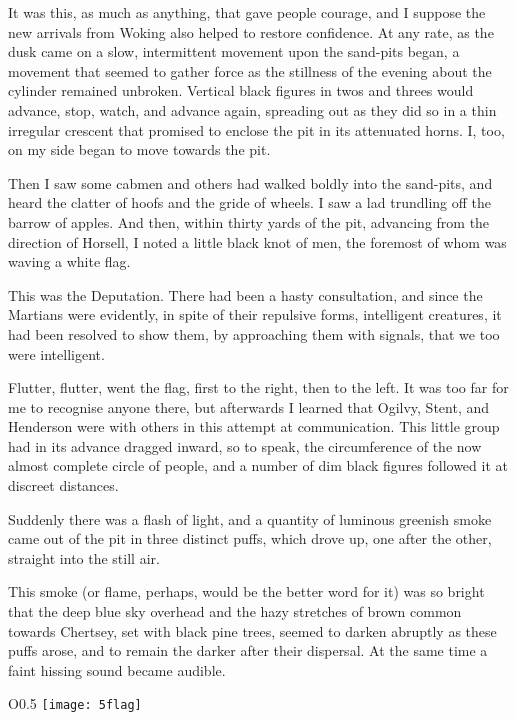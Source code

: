 It was this, as much as anything, that gave people courage, and I suppose the new arrivals from Woking also helped to restore confidence. At any rate, as the dusk came on a slow, intermittent movement upon the sand-pits began, a movement that seemed to gather force as the stillness of the evening about the cylinder remained unbroken. Vertical black figures in twos and threes would advance, stop, watch, and advance again, spreading out as they did so in a thin irregular crescent that promised to enclose the pit in its attenuated horns. I, too, on my side began to move towards the pit.

Then I saw some cabmen and others had walked boldly into the sand-pits, and heard the clatter of hoofs and the gride of wheels. I saw a lad trundling off the barrow of apples. And then, within thirty yards of the pit, advancing from the direction of Horsell, I noted a little black knot of men, the foremost of whom was waving a white flag.

This was the Deputation. There had been a hasty consultation, and since the Martians were evidently, in spite of their repulsive forms, intelligent creatures, it had been resolved to show them, by approaching them with signals, that we too were intelligent.

Flutter, flutter, went the flag, first to the right, then to the left. It was too far for me to recognise anyone there, but afterwards I learned that Ogilvy, Stent, and Henderson were with others in this attempt at communication. This little group had in its advance dragged inward, so to speak, the circumference of the now almost complete circle of people, and a number of dim black figures followed it at discreet distances.

Suddenly there was a flash of light, and a quantity of luminous greenish smoke came out of the pit in three distinct puffs, which drove up, one after the other, straight into the still air.

This smoke (or flame, perhaps, would be the better word for it) was so bright that the deep blue sky overhead and the hazy stretches of brown common towards Chertsey, set with black pine trees, seemed to darken abruptly as these puffs arose, and to remain the darker after their dispersal. At the same time a faint hissing sound became audible.

\begin{wrapfigure}{O}{0.5\textwidth}
\centering
\texttt{[image: 5flag]}
\end{wrapfigure}

